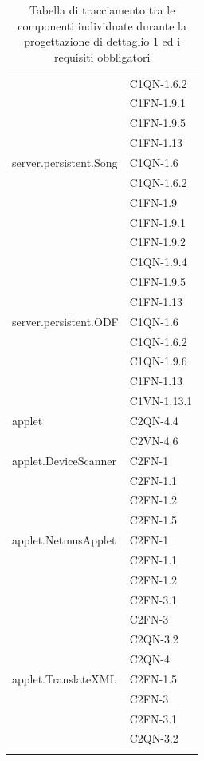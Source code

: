 \begin{footnotesize}
\begin{longtable}[!h]{|l|l|}
& C1QN-1.6.2\\
& C1FN-1.9.1\\\
& C1FN-1.9.5\\
& C1FN-1.13\\\hline 
server.persistent.Song  & C1QN-1.6\\
& C1QN-1.6.2\\
& C1FN-1.9\\
& C1FN-1.9.1\\
& C1FN-1.9.2\\
& C1QN-1.9.4\\
& C1FN-1.9.5\\
& C1FN-1.13\\\hline 
server.persistent.ODF  &  C1QN-1.6\\
& C1QN-1.6.2\\
& C1QN-1.9.6\\
& C1FN-1.13 \\
& C1VN-1.13.1\\\hline 
applet  &  C2QN-4.4\\
& C2VN-4.6 \\\hline
applet.DeviceScanner  &  C2FN-1\\
& C2FN-1.1\\
& C2FN-1.2\\
& C2FN-1.5\\\hline
applet.NetmusApplet  & C2FN-1 \\
& C2FN-1.1 \\
& C2FN-1.2 \\
& C2FN-3.1 \\
& C2FN-3\\
& C2QN-3.2\\
& C2QN-4\\\hline
applet.TranslateXML  &  C2FN-1.5 \\
& C2FN-3\\
& C2FN-3.1\\
& C2QN-3.2\\\hline
\caption{Tabella di tracciamento tra le componenti individuate durante la
progettazione di dettaglio 1 ed i requisiti obbligatori}
\end{longtable}
\end{footnotesize}

